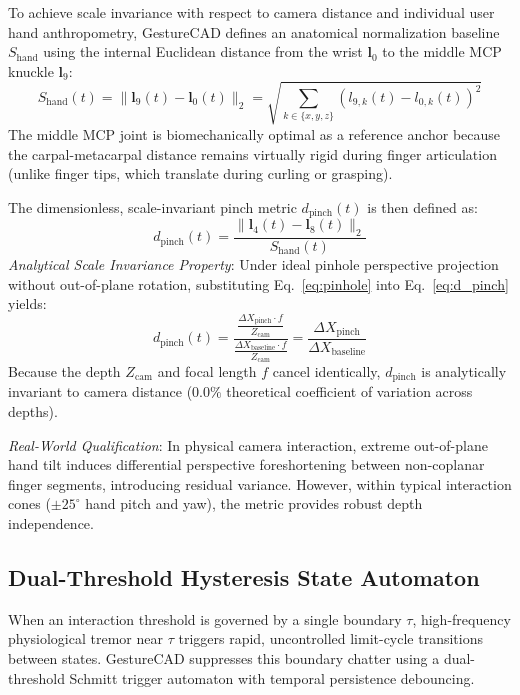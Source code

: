 To achieve scale invariance with respect to camera distance and individual user hand anthropometry, GestureCAD defines an anatomical normalization baseline $S_{\text{hand}}$ using the internal Euclidean distance from the wrist $\mathbf{l}_0$ to the middle MCP knuckle $\mathbf{l}_9$:
\begin{equation}
S_{\text{hand}}(t) = \|\mathbf{l}_9(t) - \mathbf{l}_0(t)\|_2 = \sqrt{\sum_{k \in \{x, y, z\}} (l_{9, k}(t) - l_{0, k}(t))^2}
\label{eq:hand_size}
\end{equation}
The middle MCP joint is biomechanically optimal as a reference anchor because the carpal-metacarpal distance remains virtually rigid during finger articulation (unlike finger tips, which translate during curling or grasping).

The dimensionless, scale-invariant pinch metric $d_{\text{pinch}}(t)$ is then defined as:
\begin{equation}
d_{\text{pinch}}(t) = \frac{\|\mathbf{l}_4(t) - \mathbf{l}_8(t)\|_2}{S_{\text{hand}}(t)}
\label{eq:d_pinch}
\end{equation}
\textit{Analytical Scale Invariance Property}: Under ideal pinhole perspective projection without out-of-plane rotation, substituting Eq.~\eqref{eq:pinhole} into Eq.~\eqref{eq:d_pinch} yields:
\begin{equation}
d_{\text{pinch}}(t) = \frac{\frac{\Delta X_{\text{pinch}} \cdot f}{Z_{\text{cam}}}}{\frac{\Delta X_{\text{baseline}} \cdot f}{Z_{\text{cam}}}} = \frac{\Delta X_{\text{pinch}}}{\Delta X_{\text{baseline}}}
\label{eq:scale_invariance_proof}
\end{equation}
Because the depth $Z_{\text{cam}}$ and focal length $f$ cancel identically, $d_{\text{pinch}}$ is analytically invariant to camera distance ($0.0\%$ theoretical coefficient of variation across depths). 

\textit{Real-World Qualification}: In physical camera interaction, extreme out-of-plane hand tilt induces differential perspective foreshortening between non-coplanar finger segments, introducing residual variance. However, within typical interaction cones ($\pm 25^\circ$ hand pitch and yaw), the metric provides robust depth independence.

\subsection{Dual-Threshold Hysteresis State Automaton}
When an interaction threshold is governed by a single boundary $\tau$, high-frequency physiological tremor near $\tau$ triggers rapid, uncontrolled limit-cycle transitions between states. GestureCAD suppresses this boundary chatter using a dual-threshold Schmitt trigger automaton with temporal persistence debouncing.

